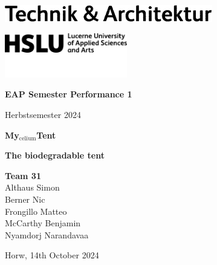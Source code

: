 \documentclass{article}
\begin{document}
\hypersetup{citecolor=black}

\begin{titlepage}
    \begin{flushleft}
        \hspace*{.01cm}
        \includegraphics[width=.3\textwidth]{media/hslu-logo-2.png}

        \vspace*{.01cm}
        \hspace*{.16cm}\includegraphics[width=0.4\textwidth]{media/hslu-svg-logo.png}
    \end{flushleft}

    \vspace*{-.4cm}
    {\huge \textbf{EAP Semester Performance 1}}

    {\Large Herbstsemester 2024}

    \vspace*{3cm}
    \begin{center}
        {\Huge \textbf{My$_{\text{celium}}$Tent}}

        \vspace*{.1cm}
        \textbf{\large The biodegradable tent}

    \end{center}

    \vfill
    {\Large \textbf{Team 31}}\\
    {\large \vspace*{.01cm}
        Althaus Simon\\
        \vspace*{.01cm}
        Berner Nic\\
        \vspace*{.01cm}   
        Frongillo Matteo\\
        \vspace*{.01cm}
        McCarthy Benjamin\\
        \vspace*{.01cm}
        Nyamdorj Narandavaa\\
        \vspace*{.01cm}
    }
    
    \vspace{1cm}
    {\large Horw, 14th October 2024}
\end{titlepage}
\end{document}
